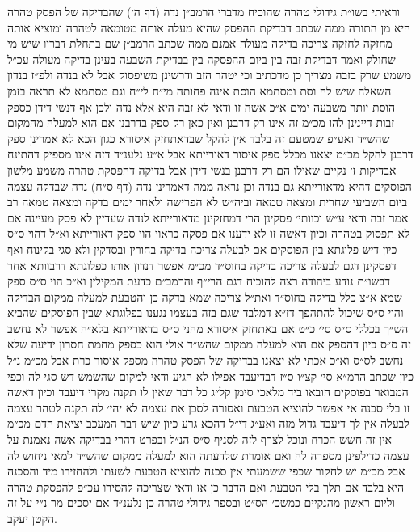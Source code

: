\documentclass[12pt, openany]{book}
\begin{document}
\begin{multicols}{2}
וראיתי בשו״ת גידולי טהרה שהוכיח מדברי הרמב״ן נדה (דף ה׳) שהבדיקה של הפסק טהרה היא מן התורה ממה שכתב דבדיקת ההפסק שהיא מעלה אותה מטומאה לטהרה ומוציא אותה מחזקה לחזקה צריכה בדיקה מעולה אמנם ממה שכתב הרמב״ן שם בתחלת דבריו שיש מי שחולק ואמר דבדיקת זבה בין ביום ההפסקה בין בבדיקת השבעה בעינן בדיקה מעולה עכ״ל משמע שרק בזבה מצריך כן מדכתיב וכי יטהר הזב ודרשינן משיפסוק אבל לא בנדה ולפ״ז בנדון השאלה שיש לה וסת ומסתמא הוסת אינה פחותה מי״ח לי״ח וגם מסתמא לא תראה בזמן הוסת יותר משבעה ימים א״כ אשה זו ודאי לא זבה היא אלא נדה ולכן אף דנשי דידן כספק זבות דיינינן להו מכ״מ זה אינו רק דרבנן ואין כאן רק ספק בדרבנן אם הוא למעלה מהמקום שהש״ד ואע״פ שמטעם זה בלבד אין להקל שבדאתחזק איסורא כגון הכא לא אמרינן ספק דרבנן להקל מכ״מ יצאנו מכלל ספק איסור דאורייתא אבל א״ע נלענ״ד דזה אינו מספיק דהתינח אבדיקות ז׳ נקיים שאילו הם רק דרבנן בנשי דידן אבל בדיקה דהפסקת טהרה משמע מלשון הפוסקים דהיא מדאורייתא גם בנדה וכן נראה ממה דאמרינן נדה (דף ס״ח) נדה שבדקה עצמה ביום השביעי שחרית ומצאה טמאה וביה״ש לא הפרישה ולאחר ימים בדקה ומצאה טמאה רב אמר זבה ודאי ע״ש וכוותי׳ פסקינן הרי דמחזקינן מדאורייתא לנדה שעדיין לא פסק מעיינה אם לא תפסוק בטהרה וכיון דאשה זו לא ידענו אם פסקה כראוי הוי ספק דאורייתא וא״ל דהוי ס״ס כיון דיש פלוגתא בין הפוסקים אם לבעלה צריכה בדיקה בחורין ובסדקין ולא סגי בקינוח ואף דפסקינן דגם לבעלה צריכה בדיקה בחוס״ד מכ״מ אפשר דנדון אותו כפלוגתא דרבוותא אחר דבשו״ת נודע ביהודה רצה להוכיח דגם הרי״ף והרמב״ם כדעת המקילין וא״כ הוי ס״ס ספק שמא א״צ כלל בדיקה בחוס״ד ואת״ל צריכה שמא בדקה כן והטבעת למעלה ממקום הבדיקה והוי ס״ס שיכול להתהפך דז״א דמלבד שגם בזה בעצמו נגענו בפלוגתא שבין הפוסקים שהביא הש״ך בכללי ס״ס סי׳ כ״ט אם באתחזק איסורא מהני ס״ס בדאורייתא בלא״ה אפשר לא נחשב זה ס״ס כיון דהספק אם הוא למעלה ממקום שהש״ד אולי הוא כספק מחמת חסרון ידיעה שלא נחשב לס״ס וא״כ אכתי לא יצאנו בבדיקה של הפסק טהרה מספק איסור כרת אבל מכ״מ נ״ל כיון שכתב הרמ״א סי׳ קצ״ו ס״ז דבדיעבד אפילו לא הגיע ודאי למקום שהשמש דש סגי לה וכפי המבואר בפוסקים הובאו ביד מלאכי סימן קל״ג כל דבר שאין לו תקנה מקרי דיעבד וכיון דאשה זו בלי סכנה אי אפשר להוציא הטבעת ואסורה לסכן את עצמה לא יהי׳ לה תקנה לטהר עצמה לבעלה אין לך דיעבד גדול מזה ואע״ג די״ל דהכא גרע כיון שיש דבר המעכב יציאת הדם מכ״מ אין זה חשש הכרח ונוכל לצרף לזה לסניף ס״ס הנ״ל ובפרט דהרי בבדיקה אשה נאמנת על עצמה כדילפינן מספרה לה ואם אומרת שלדעתה הוא למעלה ממקום שהש״ד למאי ניחוש לה אבל מכ״מ יש לחקור שכפי ששמעתי אין סכנה להוציא הטבעת לשעתו ולהחזירו מיד והסכנה היא בלבד אם תלך בלי הטבעת ואם הדבר כן אז ודאי שצריכה להסירו עכ״פ להפסקת טהרה וליום ראשון מהנקיים כמשכ׳ הס״ט ובספר גידולי טהרה כן נלענ״ד אם יסכים מר נ״י על זה הקטן יעקב.\\\vspace{0pt}

\end{multicols}\newpage
\end{document}
